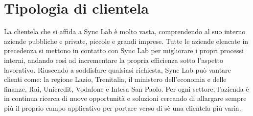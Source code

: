 
\section{Tipologia di clientela}
La clientela che si affida a Sync Lab è molto vasta, comprendendo al suo interno aziende pubbliche e private, piccole e grandi imprese. Tutte le aziende elencate in precedenza si mettono in contatto con Sync Lab per migliorare i propri processi interni, andando così ad incrementare la propria efficienza sotto l'aspetto lavorativo. Riuscendo a soddisfare qualsiasi richiesta, Sync Lab può vantare clienti come: la regione Lazio, Trenitalia, il ministero dell'economia e delle finanze, Rai, Unicredit, Vodafone e Intesa San Paolo. Per ogni settore, l'azienda è in continua ricerca di nuove opportunità e soluzioni cercando di allargare sempre più il proprio campo applicativo per portare verso di sè una clientela più varia.
